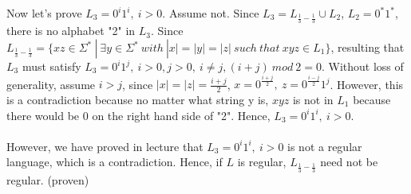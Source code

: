 \documentclass[letterpaper, 12pt]{article}
\theoremstyle{definition}
\numberwithin{equation}{section}
\begin{document}
Now let's prove $L_3 = 0^i1^i,\ i > 0$. Assume not. Since $L_3 = L_{\frac{1}{3}-\frac{1}{3}} \cup L_2$, $L_2 = 0^*1^*$, there is no alphabet "2" in $L_3$. Since $L_{\frac{1}{3}-\frac{1}{3}} = \{xz \in \Sigma^*\ |\ \exists y \in \Sigma^*\  with\  |x|=|y|=|z|\ such\ that\ xyz \in L_1\}$, resulting that $L_3$ must satisfy $L_3 = 0^i1^j,\ i >0,j>0,\ i \neq j, (i+j)\ mod\ 2 = 0$. Without loss of generality, assume $i > j$, since $|x|=|z|=\frac{i+j}{2}$, $x = 0^{\frac{i+j}{2}},\ z = 0^\frac{i-j}{2}1^j $. However, this is a contradiction because no matter what string y is, $xyz$ is not in $L_1$ because there would be $0$ on the right hand side of "2". Hence, $L_3 = 0^i1^i,\ i > 0$. \\~\\

However, we have proved in lecture that $L_3 = 0^i1^i,\ i > 0$ is not a regular language, which is a contradiction. Hence, if $L$ is regular, $L_{\frac{1}{3}-\frac{1}{3}}$ need not be regular. (proven)
\end{document}
